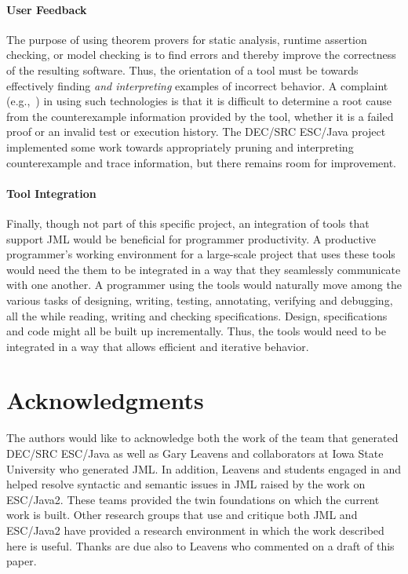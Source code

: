 \documentclass{article}
\begin{document}
\paragraph*{User Feedback} The purpose of using theorem provers for
static analysis, runtime assertion checking, or model checking is to
find errors and thereby improve the correctness of the resulting
software.  Thus, the orientation of a tool must be towards effectively
finding \emph{and interpreting} examples of incorrect behavior.  A
complaint (e.g.,~\cite{GroceVisser03}) in using such technologies is that it is difficult
to determine a root cause from the counterexample information provided
by the tool, whether it is a failed proof or an invalid test or
execution history.  The DEC/SRC ESC/Java project implemented some work towards
appropriately pruning and interpreting counterexample and trace information, but
there remains room for improvement.

\paragraph*{Tool Integration} Finally, though not part of this specific
project, an integration of tools that support JML would be beneficial for
programmer productivity.
A productive programmer's working environment for a large-scale
project that uses these tools would need the them to be integrated in
a way that they seamlessly communicate with one another.  A
programmer using the tools would naturally move among the various
tasks of designing, writing,
testing, annotating, verifying and debugging, all the while reading, writing
and checking specifications.  Design, specifications and code might all
be built up incrementally.  Thus, the tools would
need to be integrated in a way that allows efficient and iterative
behavior.

\section{Acknowledgments}
The authors would like to acknowledge both the work of the team that
generated DEC/SRC ESC/Java as well as Gary Leavens and collaborators
at Iowa State University who generated JML.  In addition, Leavens and
students engaged in and helped resolve syntactic and semantic issues
in JML raised by the work on ESC/Java2.  These teams provided the twin
foundations on which the current work is built.  
Other research groups that use and critique both JML and ESC/Java2
have provided a research environment in which the work described here
is useful.   Thanks are due also to Leavens who commented on 
a draft of this paper.  
\end{document}
